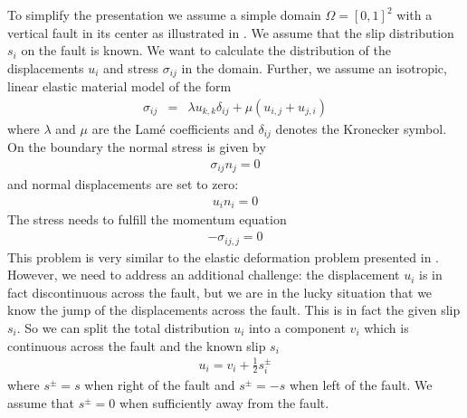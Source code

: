 To simplify the presentation we assume a simple domain $\Omega=[0,1]^2$ with
a vertical fault in its center as illustrated in .
We assume that the slip distribution $s_{i}$ on the fault is known.
We want to calculate the distribution of the displacements $u_{i}$
and stress $\sigma_{ij}$ in the domain.
Further, we assume an isotropic, linear elastic material model of the form
\begin{eqnarray} \label{Slip  stress}
\sigma_{ij} & = & \lambda u_{k,k} \delta_{ij} + \mu ( u_{i,j} + u_{j,i})
\end{eqnarray}
where $\lambda$ and $\mu$ are the Lam\'e coefficients
and $\delta_{ij}$ denotes the Kronecker symbol.
On the boundary the normal stress is given by
\begin{eqnarray} \label{Slip natural fault}
\sigma_{ij}n_{j}=0
\end{eqnarray}
and normal displacements are set to zero:
\begin{eqnarray} \label{Slip constraint}
u_{i}n_{i} =0
\end{eqnarray}
The stress needs to fulfill the momentum equation
\begin{eqnarray}\label{Slip general problem}
- \sigma_{ij,j}=0
\end{eqnarray}
This problem is very similar to the elastic deformation problem presented in .
However, we need to address an additional challenge: the displacement
$u_{i}$ is in fact discontinuous across the fault, but we are in the
lucky situation that we know the jump of the displacements across the fault.
This is in fact the given slip $s_{i}$.
So we can split the total distribution $u_{i}$ into a component
$v_{i}$ which is continuous across the fault and the known slip $s_{i}$
\begin{eqnarray}\label{Slip Split}
u_{i} = v_{i} + \frac{1}{2} s^{\pm}_{i}
\end{eqnarray}
where $s^{\pm}=s$ when right of the fault and $s^{\pm}=-s$ when left of the fault.
We assume that $s^{\pm}=0$ when sufficiently away from the fault.

